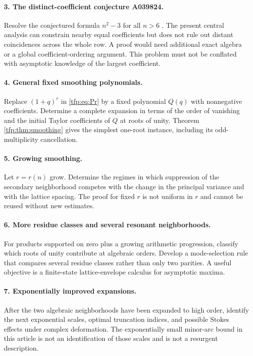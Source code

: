 \documentclass[11pt,a4paper]{article}
\numberwithin{equation}{section}
\theoremstyle{definition}\newtheorem{definition}[theorem]{Definition}
\theoremstyle{remark}\newtheorem{remark}[theorem]{Remark}
\begin{document}
\paragraph{3. The distinct-coefficient conjecture A039824.}
Resolve the conjectured formula $n^2-3$ for all $n>6$
\cite{oeis824}. The present central analysis can constrain nearby equal
coefficients but does not rule out distant coincidences across the
whole row. A proof would need additional exact algebra or a global
coefficient-ordering argument. This problem must not be conflated with
asymptotic knowledge of the largest coefficient.

\paragraph{4. General fixed smoothing polynomials.}
Replace $(1+q)^r$ in \eqref{tfp:eq:Pr} by a fixed polynomial $Q(q)$ with
nonnegative coefficients. Determine a complete expansion in terms of
the order of vanishing and the initial Taylor coefficients of $Q$ at
roots of unity. Theorem \ref{tfp:thm:smoothing} gives the simplest
one-root instance, including its odd-multiplicity cancellation.

\paragraph{5. Growing smoothing.}
Let $r=r(n)$ grow. Determine the regimes in which suppression of the
secondary neighborhood competes with the change in the principal
variance and with the lattice spacing. The proof for fixed $r$ is not
uniform in $r$ and cannot be reused without new estimates.

\paragraph{6. More residue classes and several resonant neighborhoods.}
For products supported on zero plus a growing arithmetic progression,
classify which roots of unity contribute at algebraic orders. Develop
a mode-selection rule that compares several residue classes rather
than only two parities. A useful objective is a finite-state
lattice-envelope calculus for asymptotic maxima.

\paragraph{7. Exponentially improved expansions.}
After the two algebraic neighborhoods have been expanded to high order,
identify the next exponential scales, optimal truncation indices, and
possible Stokes effects under complex deformation. The exponentially
small minor-arc bound in this article is not an identification of those
scales and is not a resurgent description.
\end{document}
